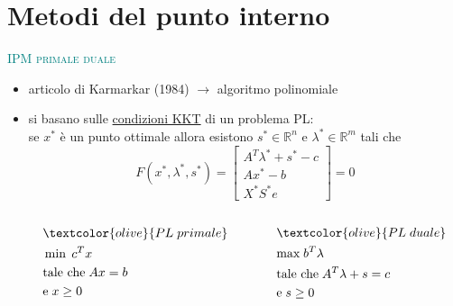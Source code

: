 
\section{Metodi del punto interno}

\begin{frame}[t]{\textcolor{teal}{\textsc{\LARGE IPM primale duale}}}
	\begin{itemize}
		\item articolo di Karmarkar (1984) %
		$\rightarrow$ algoritmo polinomiale
		\pause
		\item si basano sulle \underline{condizioni KKT} di un problema PL:
		\pause\\ se $x^{*}$ è un punto ottimale allora esistono $s^{*}\in\mathbb{R}^{n}$ e $\lambda^{*}\in\mathbb{R}^{m}$ tali che
		\begin{equation*}
		\mathit{F}(x^{*},\lambda^{*},s^{*})= \begin{bmatrix}
		A^{T}\lambda^{*}+s^{*}-c \\Ax^{*}-b \\X^{*}S^{*}e
		\end{bmatrix}=0
		\end{equation*}
		\pause
		\begin{columns}
		\begin{column}{0.4\textwidth}
		\begin{equation*}
		\begin{split}
		&\textcolor{olive}{PL\; primale}\\
		&\min\;c^{T}x\\
		&\text{tale che\;}Ax= b\;\\&\text{e\;}x\geq0
		\end{split}
		\end{equation*}	
		\end{column}
		\begin{column}{0.4\textwidth}
		\begin{equation*}
		\begin{split}
		&\textcolor{olive}{PL\; duale}\\
		&\text{max\;}b^{T}\lambda\\
		&\text{tale che\;}A^{T}\lambda+s=c\\ &\text{e\;} s\geq0
		\end{split}
		\end{equation*}	
		\end{column}		
		\end{columns}
	\end{itemize}
\end{frame}

